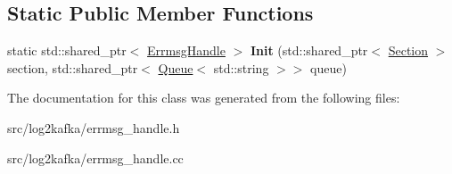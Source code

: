 \subsection*{Static Public Member Functions}
\begin{DoxyCompactItemize}
\item 
static std\+::shared\+\_\+ptr$<$ \hyperlink{classlog2hdfs_1_1ErrmsgHandle}{Errmsg\+Handle} $>$ {\bfseries Init} (std\+::shared\+\_\+ptr$<$ \hyperlink{classlog2hdfs_1_1Section}{Section} $>$ section, std\+::shared\+\_\+ptr$<$ \hyperlink{classlog2hdfs_1_1Queue}{Queue}$<$ std\+::string $>$$>$ queue)\hypertarget{classlog2hdfs_1_1ErrmsgHandle_a4e472a2c8e3425249b1ac21e7d324e63}{}\label{classlog2hdfs_1_1ErrmsgHandle_a4e472a2c8e3425249b1ac21e7d324e63}

\end{DoxyCompactItemize}


The documentation for this class was generated from the following files\+:\begin{DoxyCompactItemize}
\item 
src/log2kafka/errmsg\+\_\+handle.\+h\item 
src/log2kafka/errmsg\+\_\+handle.\+cc\end{DoxyCompactItemize}
